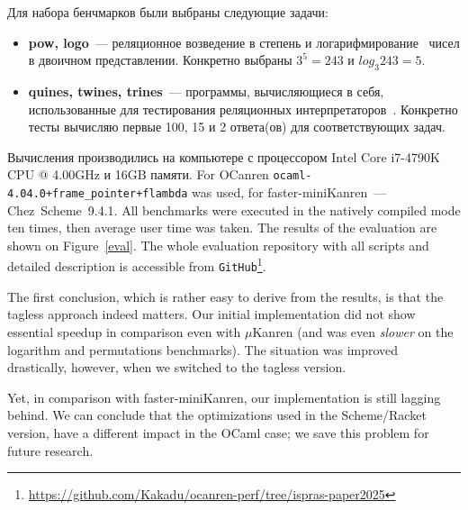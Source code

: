 \FloatBarrier

Для набора бенчмарков были выбраны следующие задачи:

\begin{itemize}
\item \textbf{pow, logo}~--- реляционное возведение в степень и логарифмирование~\cite{KiselyovArithm} чисел в двоичном представлении.
Конкретно выбраны $3^5=243$ и $log_3 243=5$.
\item \textbf{quines, twines, trines}~--- программы, вычисляющиеся в себя, использованные для тестирования реляционных интерпретаторов~\cite{Untagged}.
Конкретно тесты вычисляю первые 100, 15 и 2 ответа(ов) для соответствующих задач.
\end{itemize}


Вычисления производились на компьютере с процессором Intel Core i7-4790K CPU @ 4.00GHz и 16GB памяти.
For OCanren \texttt{ocaml-4.04.0+frame\_pointer+flambda} was used,
for faster-miniKanren~--- Chez~Scheme~9.4.1.
All benchmarks were executed in the natively compiled mode ten times, then average user time was taken. The results of the evaluation
are shown on Figure~\ref{eval}. The whole evaluation repository with all scripts and detailed description is accessible
from \lstinline|GitHub|\footnote{\url{https://github.com/Kakadu/ocanren-perf/tree/ispras-paper2025}}.

The first conclusion, which is rather easy to derive from the results, is that the tagless approach indeed matters. Our initial
implementation did not show essential speedup in comparison even with $\mu$Kanren (and was even \emph{slower} on the logarithm
and permutations benchmarks). The situation was improved drastically, however, when we switched to the tagless version.

Yet, in comparison with faster-miniKanren, our implementation is still lagging behind. We can conclude that the optimizations
used in the Scheme/Racket version, have a different impact in the OCaml case; we save this problem for future research.

